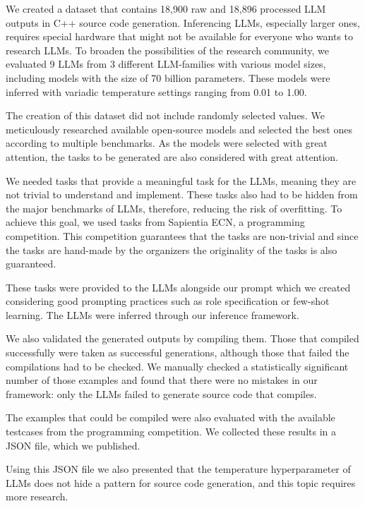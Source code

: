 We created a dataset that contains 18,900 raw and 18,896 processed LLM outputs in C++ source code generation.
Inferencing LLMs, especially larger ones, requires special hardware that might not be available for everyone who wants to research LLMs.
To broaden the possibilities of the research community, we evaluated 9 LLMs from 3 different LLM-families with various model sizes, including models with the size of 70 billion parameters.
These models were inferred with variadic temperature settings ranging from 0.01 to 1.00.

The creation of this dataset did not include randomly selected values.
We meticulously researched available open-source models and selected the best ones according  to multiple benchmarks.
As the models were selected with great attention, the tasks to be generated are also considered with great attention.

We needed tasks that provide a meaningful task for the LLMs, meaning they are not trivial to understand and implement.
These tasks also had to be hidden from the major benchmarks of LLMs, therefore, reducing the risk of overfitting.
To achieve this goal, we used tasks from Sapientia ECN, a programming competition.
This competition guarantees that the tasks are non-trivial and since the tasks are hand-made by the organizers the originality of the tasks is also guaranteed.

These tasks were provided to the LLMs alongside our prompt which we created considering good prompting practices such as role specification or few-shot learning.
The LLMs were inferred through our inference framework.

We also validated the generated outputs by compiling them.
Those that compiled successfully were taken as successful generations, although those that failed the compilations had to be checked.
We manually checked a statistically significant number of those examples and found that there were no mistakes in our framework: only the LLMs failed to generate source code that compiles.

The examples that could be compiled were also evaluated with the available testcases from the programming competition.
We collected these results in a JSON file, which we published.

Using this JSON file we also presented that the temperature hyperparameter of LLMs does not hide a pattern for source code generation, and this topic requires more research.
